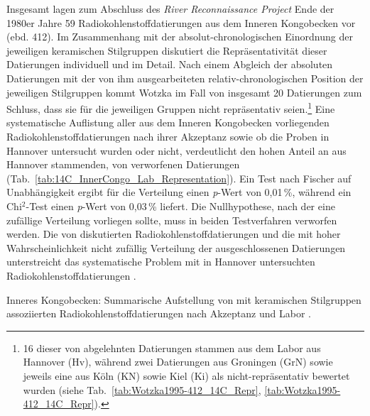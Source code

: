 Insgesamt lagen zum Abschluss des \textit{River Reconnaissance Project} Ende der 1980er Jahre 59 Radiokohlenstoffdatierungen aus dem Inneren Kongobecken vor (ebd. 412). Im Zusammenhang mit der absolut-chronologischen Einordnung der jeweiligen keramischen Stilgruppen diskutiert \textcite{Wotzka.1995} die Repräsentativität dieser Datierungen individuell und im Detail. Nach einem Abgleich der absoluten Datierungen mit der von ihm ausgearbeiteten relativ-chronologischen Position der jeweiligen Stilgruppen kommt Wotzka im Fall von insgesamt 20 Datierungen zum Schluss, dass sie für die jeweiligen Gruppen nicht repräsentativ seien.\footnote{16 dieser von \textcite{Wotzka.1995} abgelehnten Datierungen stammen aus dem Labor aus Hannover (Hv), während zwei Datierungen aus Groningen (GrN) sowie jeweils eine aus Köln (KN) sowie Kiel (Ki) als nicht-repräsentativ bewertet wurden (siehe Tab.~\ref{tab:Wotzka1995-412_14C_Repr}, \ref{tab:Wotzka1995-412_14C_Repr}).} Eine systematische Auflistung aller aus dem Inneren Kongobecken vorliegenden Radiokohlenstoffdatierungen nach ihrer Akzeptanz sowie ob die Proben in Hannover untersucht wurden oder nicht, verdeutlicht den hohen Anteil an aus Hannover stammenden, von \textcites[132f.]{Eggert.1987c}[328 Anm.~20]{Eggert.1993}[67--210]{Wotzka.1995} verworfenen Datierungen (Tab.~\ref{tab:14C_InnerCongo_Lab_Representation}). Ein Test nach Fischer auf Unabhängigkeit ergibt für die Verteilung einen \textit{p}-Wert von 0,01\,\%, während ein Chi$^2$-Test einen \textit{p}-Wert von 0,03\,\% liefert. Die Nullhypothese, nach der eine zufällige Verteilung vorliegen sollte, muss in beiden Testverfahren verworfen werden. Die von \textcite{Wotzka.1995} diskutierten Radiokohlenstoffdatierungen und die mit hoher Wahrscheinlichkeit nicht zufällig Verteilung der ausgeschlossenen Datierungen unterstreicht das systematische Problem mit in Hannover untersuchten Radiokohlenstoffdatierungen \parencite[siehe][]{Geyh.1990}.

\begin{table*}[!tb]
	\centering
	\begin{minipage}{.67\textwidth}
		{\small
			
		}
		\caption{Inneres Kongobecken: Summarische Aufstellung von mit keramischen Stilgruppen assoziierten Radiokohlenstoffdatierungen nach Akzeptanz und Labor \parencite[nach][67--210, 412; Tab.~\ref{tab:Wotzka1995-412_14C_Repr}]{Wotzka.1995}.}
		\label{tab:14C_InnerCongo_Lab_Representation}
	\end{minipage}
\end{table*}

